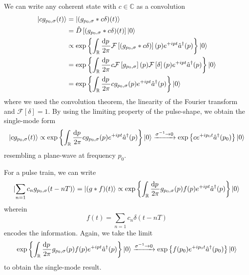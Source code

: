 We can write any coherent state with $c\in\mathbb{C}$ as a convolution
\begin{equation}
	\begin{split}
		\ket{cg_{p_0,\sigma}(t)}
		&=
		\ket{(g_{p_0,\sigma}*c\delta)(t)}
		\\
		&=
		\hat{D}\left[(g_{p_0,\sigma}*c\delta)(t)\right]
		\ket{0}
		\\
		&\propto
		\exp\left\{
			\int_{\mathbb{R}}
			\frac{\dd{p}}{2\pi}
			\mathcal{F}\left[(g_{p_0,\sigma}*c\delta)\right](p)
			e^{+ipt}
			\hat{a}^\dagger(p)
		\right\}
		\ket{0}
		\\
		&=
		\exp\left\{
			\int_{\mathbb{R}}
			\frac{\dd{p}}{2\pi}
			c
			\mathcal{F}\left[g_{p_0,\sigma}\right](p)
			\mathcal{F}\left[\delta\right](p)
			e^{+ipt}
			\hat{a}^\dagger(p)
		\right\}
		\ket{0}
		\\
		&=
		\exp\left\{
			\int_{\mathbb{R}}
			\frac{\dd{p}}{2\pi}
			cg_{p_0,\sigma}(p)
			e^{+ipt}
			\hat{a}^\dagger(p)
		\right\}
		\ket{0}
	\end{split}
\end{equation}
where we used the convolution theorem, the linearity of the Fourier transform and $\mathcal{F}[\delta]=1$.
By using the limiting property of the pulse-shape, we obtain the single-mode form
\begin{equation}
	\ket{cg_{p_0,\sigma}(t)}
	\propto
	\exp\left\{
		\int_{\mathbb{R}}
		\frac{\dd{p}}{2\pi}
		cg_{p_0,\sigma}(p)
		e^{+ipt}
		\hat{a}^\dagger(p)
	\right\}
	\ket{0}
	\xrightarrow{\sigma^{-1}\to0}
	\exp\left\{
		c
		e^{+ip_0t}
		\hat{a}^\dagger(p_0)
	\right\}
	\ket{0}
\end{equation}
resembling a plane-wave at frequency $p_0$.

For a pulse train, we can write
\begin{equation}
	\ket{\sum_{n=1}c_ng_{p_0,\sigma}(t-nT)}
	=
	\ket{(g*f)(t)}
	\propto
	\exp\left\{
		\int_{\mathbb{R}}
		\frac{\dd{p}}{2\pi}
		g_{p_0,\sigma}(p)
		f(p)e^{+ipt}
		\hat{a}^\dagger(p)
	\right\}
	\ket{0}
\end{equation}
wherein
\begin{equation}
	f(t)
	=
	\sum_{n=1}c_n\delta(t-nT)
\end{equation}
encodes the information.
Again, we take the limit
\begin{equation}
	\exp\left\{
		\int_{\mathbb{R}}
		\frac{\dd{p}}{2\pi}
		g_{p_0,\sigma}(p)
		f(p)e^{+ipt}
		\hat{a}^\dagger(p)
	\right\}
	\ket{0}
	\xrightarrow{\sigma^{-1}\to0}
	\exp\left\{
		f(p_0)
		e^{+ip_0t}
		\hat{a}^\dagger(p_0)
	\right\}
	\ket{0}	
\end{equation}
to obtain the single-mode result.

